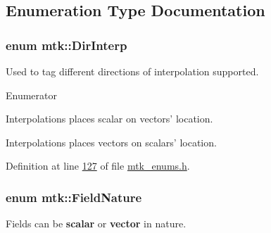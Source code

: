 \subsection{Enumeration Type Documentation}
\hypertarget{group__c02-enums_ga674ec67bd1baa04e5dc06c2bcc351972}{
\subsubsection[{Dir\+Interp}]{\setlength{\rightskip}{0pt plus 5cm}enum {\bf mtk\+::\+Dir\+Interp}}}\label{group__c02-enums_ga674ec67bd1baa04e5dc06c2bcc351972}
Used to tag different directions of interpolation supported. \begin{Desc}
\item[Enumerator]\par
\begin{description}
\item[{\em 
\hypertarget{group__c02-enums_ga674ec67bd1baa04e5dc06c2bcc351972abc9e2b8cd5a497c9f3252a792e356139}{S\+C\+A\+L\+A\+R\+\_\+\+T\+O\+\_\+\+V\+E\+C\+T\+O\+R}\label{group__c02-enums_ga674ec67bd1baa04e5dc06c2bcc351972abc9e2b8cd5a497c9f3252a792e356139}
}]Interpolations places scalar on vectors' location. \item[{\em 
\hypertarget{group__c02-enums_ga674ec67bd1baa04e5dc06c2bcc351972a122cf2e24aef105e9214698206af6904}{V\+E\+C\+T\+O\+R\+\_\+\+T\+O\+\_\+\+S\+C\+A\+L\+A\+R}\label{group__c02-enums_ga674ec67bd1baa04e5dc06c2bcc351972a122cf2e24aef105e9214698206af6904}
}]Interpolations places vectors on scalars' location. \end{description}
\end{Desc}


Definition at line \hyperlink{mtk__enums_8h_source_l00127}{127} of file \hyperlink{mtk__enums_8h_source}{mtk\+\_\+enums.\+h}.

\hypertarget{group__c02-enums_ga4c54f2a329cfb4e56213b02a259d19e2}{
\subsubsection[{Field\+Nature}]{\setlength{\rightskip}{0pt plus 5cm}enum {\bf mtk\+::\+Field\+Nature}}}\label{group__c02-enums_ga4c54f2a329cfb4e56213b02a259d19e2}
Fields can be {\bfseries scalar} or {\bfseries vector} in nature.

